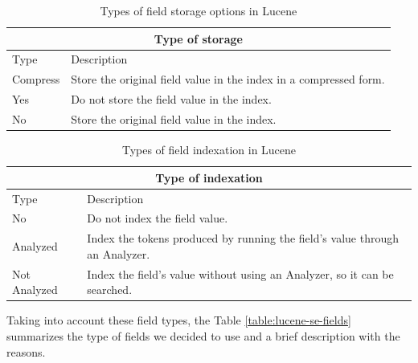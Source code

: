 \begin{table}[h!]
	\small
    \begin{center}
		\begin{tabular}{||l|l||}
        
		\hline \hline
		\multicolumn{2}{||c||}{\bfseries{Type of storage}} \\
		\hline
		\hline 
			Type & Description \\
		\hline \hline
			Compress &  Store the original field value in the index in a compressed form.\\
			\hline
			Yes &  Do not store the field value in the index. \\
			\hline
			No & Store the original field value in the index. \\
		\hline \hline

		\end{tabular}
		\caption{\label{table:lucene-storage} Types of field storage options in
		Lucene}
	\end{center}
\end{table}


\begin{table}[h!]
	\small
    \begin{center}
		\begin{tabular}{||l|l|||}
        
		\hline \hline
		\multicolumn{2}{||c||}{\bfseries{Type of indexation}} \\
		\hline
		\hline 
			Type & Description \\
		\hline \hline
			No &  Do not index the field value.\\
			\hline
			Analyzed &  Index the tokens produced by running the field's value through
			an Analyzer.\\
			\hline
			Not Analyzed & Index the field's value without using an Analyzer, so it can
			be searched.\\
			\hline \hline

		\end{tabular}
		\caption{\label{table:lucene-indexation} Types of field indexation in Lucene}
	\end{center}
\end{table}


Taking into account these field types, the Table
\ref{table:lucene-se-fields} summarizes the type of fields we decided to use
and a brief description with the reasons.

